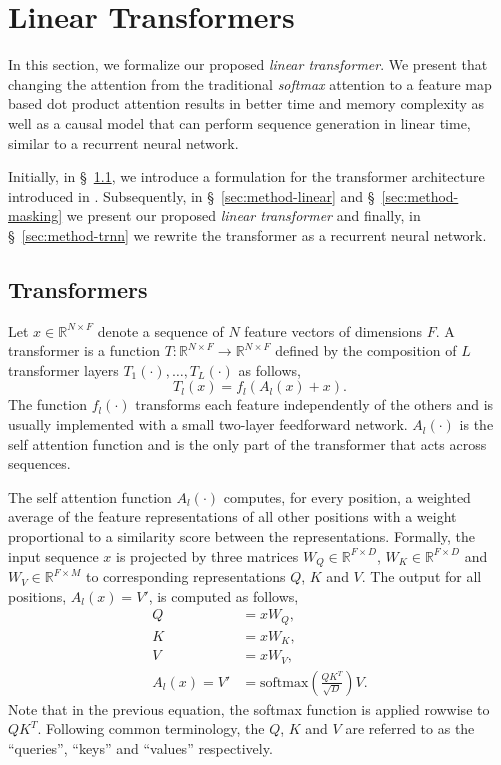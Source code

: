 \documentclass{article}
\newcommand{\linear}{\emph{linear transformer}}
\newcommand{\R}[1]{\mathbb{R}^{#1}}
\newcommand{\softmax}[1]{\text{softmax}\left(#1\right)}
\begin{document}
\section{Linear Transformers}

In this section, we formalize our proposed \linear{}. We present
that changing the attention from the traditional \emph{softmax} attention to a
feature map based dot product attention results in better time and memory
complexity as well as a causal model that can perform sequence generation in
linear time, similar to a recurrent neural network.

Initially, in \S~\ref{sec:method-intro}, we introduce a formulation for the
transformer architecture introduced in \cite{vaswani_attn}. Subsequently, in
\S~\ref{sec:method-linear} and \S~\ref{sec:method-masking} we present our
proposed \linear{} and finally, in \S~\ref{sec:method-trnn} we rewrite the
transformer as a recurrent neural network.

\subsection{Transformers} \label{sec:method-intro}

Let $x \in \R{N \times F}$ denote a sequence of $N$ feature vectors of dimensions
$F$. A transformer is a function $T : \R{N \times F} \to \R{N \times F}$
defined by the composition of $L$ transformer layers $T_1(\cdot), \dots,
T_L(\cdot)$ as follows,
\begin{equation}
    T_l(x) = f_l(A_l(x) + x).
    \label{eq:transformer}
\end{equation}
The function $f_l(\cdot)$ transforms each feature independently of the others
and is usually implemented with a small two-layer feedforward network. $A_l(\cdot)$ is the self
attention function and is the only part of the transformer that acts across
sequences.

The self attention function $A_l(\cdot)$ computes, for every position, a
weighted average of the feature representations of all other positions with a
weight proportional to a similarity score between the representations.
Formally, the input sequence $x$ is projected by three matrices $W_Q \in \R{F
\times D}$, $W_K \in \R{F \times D}$ and $W_V \in \R{F \times M}$ to
corresponding representations $Q$, $K$ and $V$. The output for all
positions, $A_l(x) = V'$, is computed as follows,
\begin{equation}
\begin{aligned}
    Q &= x W_Q, \\
    K &= x W_K,  \\
    V &= x W_V, \\
    A_l(x) = V' &= \softmax{\frac{Q K^T}{\sqrt{D}}} V.
    \label{eq:attn}
\end{aligned}
\end{equation}
Note that in the previous equation, the softmax function is applied rowwise to
$Q K^T$. Following common terminology, the $Q$, $K$ and $V$ are referred to
as the ``queries'', ``keys'' and ``values'' respectively.
\end{document}
